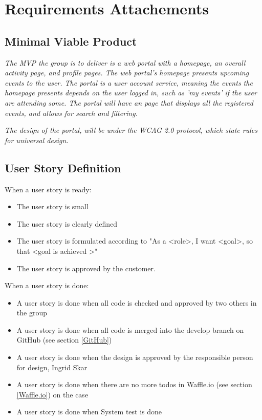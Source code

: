 \chapter{Requirements Attachements}

\section{Minimal Viable Product}
\label{original_minimal_viable_product}
\textit{ The MVP the group is to deliver is a web portal with a homepage, an overall activity page, and profile pages. The web portal's homepage presents upcoming events to the user. The portal is a user account service, meaning the events the homepage presents depends on the user logged in, such as 'my events' if the user are attending some. The portal will have an page that displays all the registered events, and allows for search and filtering. }

\textit{The design of the portal, will be under the WCAG 2.0 protocol, which state rules for universal design.}


\section{User Story Definition}
\label{user_story_definition}
\begin{description}
    \item[When a user story is ready:]
\end{description}
\begin{itemize}[noitemsep]
    \item The user story is small
    \item The user story is clearly defined
    \item The user story is formulated according to "As a \textless role\textgreater, I want \textless goal\textgreater, so that \textless goal is achieved \textgreater"
    \item The user story is approved by the customer.
\end{itemize}

\begin{description}
    \item[When a user story is done:]
\end{description}
\begin{itemize}[noitemsep]
    \item A user story is done when all code is checked and approved by two others in the group
    \item A user story is done when all code is merged into the develop branch on GitHub (see section \ref{GitHub})
    \item A user story is done when the design is approved by the responsible person for design, Ingrid Skar 
    \item A user story is done when there are no more todos in Waffle.io (see section \ref{Waffle.io}) on the case
    \item A user story is done when System test is done
\end{itemize}

